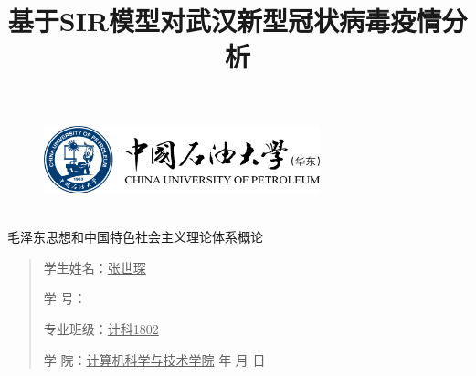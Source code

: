 \documentclass[12pt]{article}
\title{基于SIR模型对武汉新型冠状病毒疫情分析}
\date{}
\renewcommand{\today}{\number\year 年 \number\month 月 \number\day 日}
\begin{document}
\begin{figure}
    \includegraphics[width=8cm]{upc.png}
    \label{figupc}
\end{figure}
    \begin{center}
        \quad \\
        \heiti \fontsize{45}{17} \quad \quad \quad 
        \vskip 1cm
        \heiti {} 毛泽东思想和中国特色社会主义理论体系概论
    \end{center}
  \vskip 4cm
  \begin{quotation}
        \doublespacing
        
        \par\setlength\parindent{9em}
        \quad 

        学生姓名：\underline{\qquad \quad 张世琛  \qquad\quad}

        学\hspace{0.77cm} 号：\underline{\qquad\quad}
        
        专业班级：\underline{\qquad 计科1802 \qquad\quad  }
        
        学\hspace{0.77cm} 院：\underline{计算机科学与技术学院}
        \vskip 6cm
        \centering
        \today
    \end{quotation}
            
                
\end{document}
